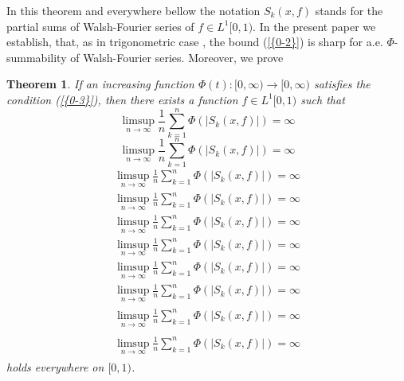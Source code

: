 \documentclass{amsart}
\newtheorem*{theorem}{Theorem}
\numberwithin{equation}{section}
\begin{document}
In this theorem and everywhere bellow the notation $S_k(x,f)$ stands for the partial sums of Walsh-Fourier series of  $f\in L^1[0,1)$.
In the present paper we establish, that, as in trigonometric case \cite{Kar2}, the bound {(\ref{{0-2}})} is sharp for a.e. $\Phi$-summability of Walsh-Fourier series. Moreover, we prove
\begin{theorem}
If an increasing function $\Phi(t):[0,\infty)\to[0,\infty)$ satisfies the condition {(\ref{{0-3}})}, then there exists a function $f\in L^1[0,1)$ such that
{
\begin{equation*} \label{0-4}
\limsup_{n\to\infty}\frac{1}{n}\sum_{k=1}^n\Phi\left(|S_k(x,f)|\right)=\infty
 \end{equation*}\fi  
{}\begin{equation}\label{0-4}
\limsup_{n\to\infty}\frac{1}{n}\sum_{k=1}^n\Phi\left(|S_k(x,f)|\right)=\infty
\end{equation}\fi   
{}\begin{align*}\label{0-4}
\limsup_{n\to\infty}\frac{1}{n}\sum_{k=1}^n\Phi\left(|S_k(x,f)|\right)=\infty
\end{align*}\fi   
{}\begin{align}\label{0-4}
\limsup_{n\to\infty}\frac{1}{n}\sum_{k=1}^n\Phi\left(|S_k(x,f)|\right)=\infty
\end{align}\fi    
{}\begin{gather*}\label{0-4}
\limsup_{n\to\infty}\frac{1}{n}\sum_{k=1}^n\Phi\left(|S_k(x,f)|\right)=\infty
\end{gather*}\fi  
{}\begin{gather}\label{0-4}
\limsup_{n\to\infty}\frac{1}{n}\sum_{k=1}^n\Phi\left(|S_k(x,f)|\right)=\infty
\end{gather}\fi   
{}\begin{multline*}\label{0-4}
\limsup_{n\to\infty}\frac{1}{n}\sum_{k=1}^n\Phi\left(|S_k(x,f)|\right)=\infty
\end{multline*}\fi  
{}\begin{multline}\label{0-4}
\limsup_{n\to\infty}\frac{1}{n}\sum_{k=1}^n\Phi\left(|S_k(x,f)|\right)=\infty
\end{multline}\fi  
{}\begin{multline*}\begin{split}\label{0-4}
\limsup_{n\to\infty}\frac{1}{n}\sum_{k=1}^n\Phi\left(|S_k(x,f)|\right)=\infty
\end{split}\end{multline*}\fi
{}\begin{multline}\begin{split}\label{0-4}
\limsup_{n\to\infty}\frac{1}{n}\sum_{k=1}^n\Phi\left(|S_k(x,f)|\right)=\infty
\end{split}\end{multline}\fi
}
holds everywhere on $[0,1)$.
\end{theorem}
\end{document}
